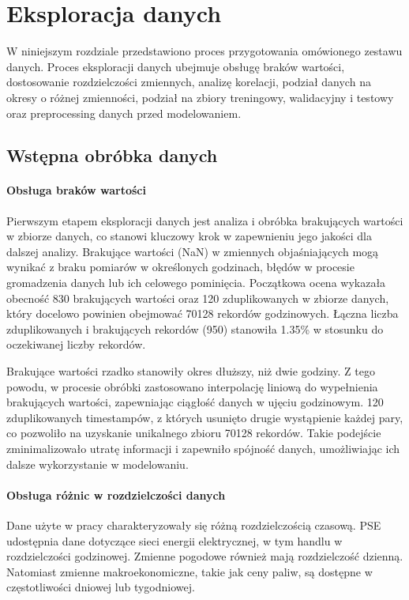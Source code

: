 \chapter{Eksploracja danych}
\label{sec:eksploracja}

W niniejszym rozdziale przedstawiono proces przygotowania omówionego zestawu danych. Proces eksploracji danych ubejmuje obsługę braków wartości, dostosowanie rozdzielczości zmiennych, analizę korelacji, podział danych na okresy o różnej zmienności, podział na zbiory treningowy, walidacyjny i testowy oraz preprocessing danych przed modelowaniem.

\section{Wstępna obróbka danych}
\subsubsection{Obsługa braków wartości}
Pierwszym etapem eksploracji danych jest analiza i obróbka brakujących wartości w zbiorze danych, co stanowi kluczowy krok w zapewnieniu jego jakości dla dalszej analizy. Brakujące wartości (NaN) w zmiennych objaśniających mogą wynikać z braku pomiarów w określonych godzinach, błędów w procesie gromadzenia danych lub ich celowego pominięcia. Początkowa ocena wykazała obecność 830 brakujących wartości oraz 120 zduplikowanych w zbiorze danych, który docelowo powinien obejmować 70128 rekordów godzinowych. Łączna liczba zduplikowanych i brakujących rekordów (950) stanowiła 1.35\% w stosunku do oczekiwanej liczby rekordów.

Brakujące wartości rzadko stanowiły okres dłuższy, niż dwie godziny. Z tego powodu, w procesie obróbki zastosowano interpolację liniową do wypełnienia brakujących wartości, zapewniając ciągłość danych w ujęciu godzinowym. 120 zduplikowanych timestampów, z których usunięto drugie wystąpienie każdej pary, co pozwoliło na uzyskanie unikalnego zbioru 70128 rekordów. Takie podejście zminimalizowało utratę informacji i zapewniło spójność danych, umożliwiając ich dalsze wykorzystanie w modelowaniu.

\subsubsection{Obsługa różnic w rozdzielczości danych}
Dane użyte w pracy charakteryzowały się różną rozdzielczością czasową. PSE udostępnia dane dotyczące sieci energii elektrycznej, w tym handlu w rozdzielczości godzinowej. Zmienne pogodowe również mają rozdzielczość dzienną. Natomiast zmienne makroekonomiczne, takie jak ceny paliw, są dostępne w częstotliwości dniowej lub tygodniowej.

